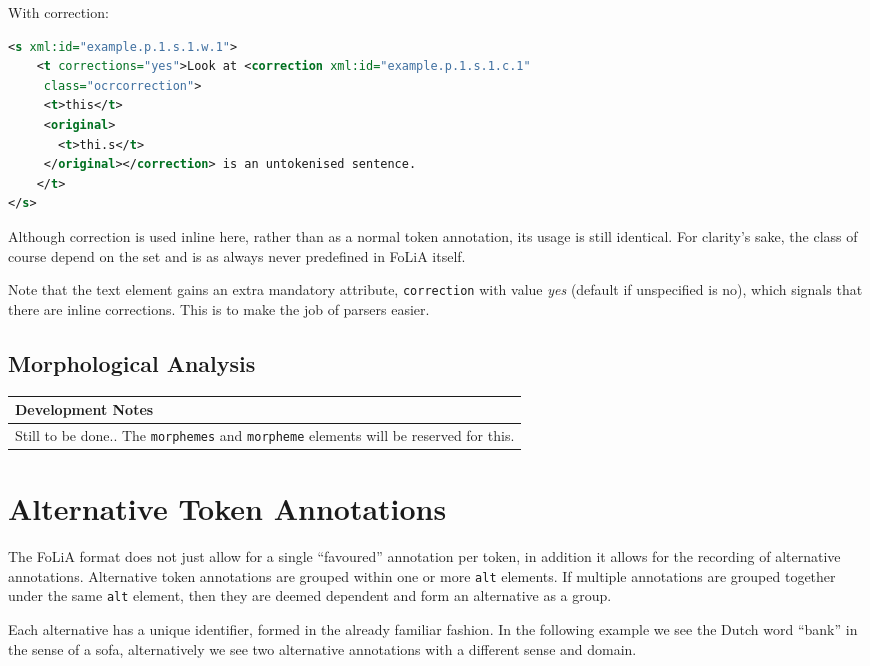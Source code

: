 \documentclass[a4paper,12pt]{report}
\newenvironment{devnotes}
{
\begin{center}
    \begin{tabular}[h!]{|p{0.8\textwidth}|}
    \hline
    {\bf Development Notes}\\\hline}
{   \\\hline
    \end{tabular}
\end{center}}
\begin{document}
With correction:

\begin{lstlisting}[language=xml]
<s xml:id="example.p.1.s.1.w.1">
    <t corrections="yes">Look at <correction xml:id="example.p.1.s.1.c.1"
     class="ocrcorrection">
     <t>this</t>
     <original>
       <t>thi.s</t>
     </original></correction> is an untokenised sentence.
    </t>
</s>                         
\end{lstlisting}

Although correction is used inline here, rather than as a normal token annotation, its usage is still identical. For clarity's sake, the class of course depend on the set and is as always never predefined in FoLiA itself.

Note that the text element gains an extra mandatory attribute, \texttt{correction} with value \emph{yes} (default if unspecified is no), which signals that there are inline corrections. This is to make the job of parsers easier.

\subsection{Morphological Analysis}

\begin{devnotes}
Still to be done.. The \texttt{morphemes} and \texttt{morpheme} elements will be reserved for this.
\end{devnotes}


\section{Alternative Token Annotations}

The FoLiA format does not just allow for a single ``favoured'' annotation per token, in addition it allows for the recording of alternative annotations. Alternative token annotations are grouped within one or more \texttt{alt} elements. If multiple annotations are grouped together under the same \texttt{alt} element, then they are deemed dependent and form an alternative as a group.

Each alternative has a unique identifier, formed in the already familiar fashion. In the following example we see the Dutch word ``bank'' in the sense of a sofa, alternatively we see two alternative annotations with a different sense and domain.
\end{document}
